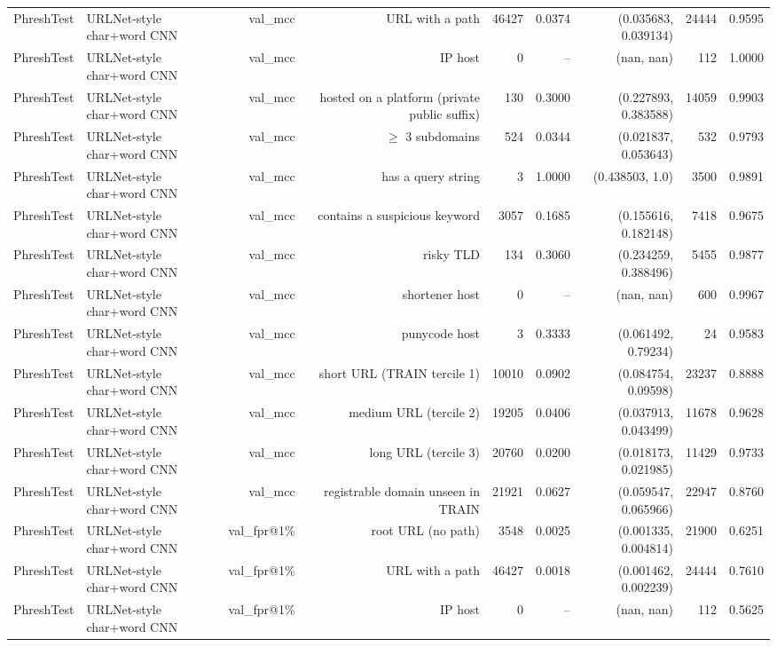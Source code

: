\begin{table}[t]
\begin{tabular}{llrrrrrrr}
PhreshTest & URLNet-style char+word CNN & val\_mcc & URL with a path & 46427 & 0.0374 & (0.035683, 0.039134) & 24444 & 0.9595 \\
PhreshTest & URLNet-style char+word CNN & val\_mcc & IP host & 0 & -- & (nan, nan) & 112 & 1.0000 \\
PhreshTest & URLNet-style char+word CNN & val\_mcc & hosted on a platform (private public suffix) & 130 & 0.3000 & (0.227893, 0.383588) & 14059 & 0.9903 \\
PhreshTest & URLNet-style char+word CNN & val\_mcc & $\geq$ 3 subdomains & 524 & 0.0344 & (0.021837, 0.053643) & 532 & 0.9793 \\
PhreshTest & URLNet-style char+word CNN & val\_mcc & has a query string & 3 & 1.0000 & (0.438503, 1.0) & 3500 & 0.9891 \\
PhreshTest & URLNet-style char+word CNN & val\_mcc & contains a suspicious keyword & 3057 & 0.1685 & (0.155616, 0.182148) & 7418 & 0.9675 \\
PhreshTest & URLNet-style char+word CNN & val\_mcc & risky TLD & 134 & 0.3060 & (0.234259, 0.388496) & 5455 & 0.9877 \\
PhreshTest & URLNet-style char+word CNN & val\_mcc & shortener host & 0 & -- & (nan, nan) & 600 & 0.9967 \\
PhreshTest & URLNet-style char+word CNN & val\_mcc & punycode host & 3 & 0.3333 & (0.061492, 0.79234) & 24 & 0.9583 \\
PhreshTest & URLNet-style char+word CNN & val\_mcc & short URL (TRAIN tercile 1) & 10010 & 0.0902 & (0.084754, 0.09598) & 23237 & 0.8888 \\
PhreshTest & URLNet-style char+word CNN & val\_mcc & medium URL (tercile 2) & 19205 & 0.0406 & (0.037913, 0.043499) & 11678 & 0.9628 \\
PhreshTest & URLNet-style char+word CNN & val\_mcc & long URL (tercile 3) & 20760 & 0.0200 & (0.018173, 0.021985) & 11429 & 0.9733 \\
PhreshTest & URLNet-style char+word CNN & val\_mcc & registrable domain unseen in TRAIN & 21921 & 0.0627 & (0.059547, 0.065966) & 22947 & 0.8760 \\
PhreshTest & URLNet-style char+word CNN & val\_fpr@1\% & root URL (no path) & 3548 & 0.0025 & (0.001335, 0.004814) & 21900 & 0.6251 \\
PhreshTest & URLNet-style char+word CNN & val\_fpr@1\% & URL with a path & 46427 & 0.0018 & (0.001462, 0.002239) & 24444 & 0.7610 \\
PhreshTest & URLNet-style char+word CNN & val\_fpr@1\% & IP host & 0 & -- & (nan, nan) & 112 & 0.5625 \\

\end{tabular}
\end{table}
